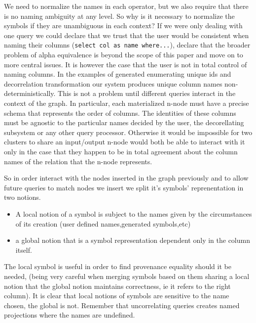 We need to normalize the names in each operator, but we also require
that there is no naming ambiguity at any level. So why is it necessary
to normalize the symbols if they are unambiguous in each context? If
we were only dealing with one query we could declare that we trust
that the user would be consistent when naming their columns (\texttt{select
  col as name where...}), declare that the broader problem of alpha
equivalence is beyond the scope of this paper and move on to more
central issues. It is however the case that the user is not in total
control of naming columns. In the examples of generated enumerating
unique ids and decorrelation transformation our system produces unique
column names non-deterministically. This is not a problem until
different queries interact in the context of the graph. In particular,
each materialized n-node must have a precise schema that represents
the order of columns. The identities of these columns must be agnostic
to the particular names decided by the user, the decorellating
subsystem or any other query processor. Otherwise it would be
impossible for two clusters to share an input/output n-node would both
be able to interact with it only in the case that they happen to be in
total agreement about the column names of the relation that the n-node
represents.

So in order interact with the nodes inserted in the graph
previously and to allow future queries to match nodes we insert we
split it's symbols' reprenentation in two notions.

\begin{itemize}
\item A local notion of a symbol is subject to the names given by the
  circumstances of its creation (user defined names,generated
  symbols,etc)
\item a global notion that is a symbol representation dependent only in
  the column itself.
\end{itemize}

The local symbol is useful in order to find provenance equality
should it be needed, (being very careful when merging symbols based
on them sharing a local notion that the global notion maintains
correctness, ie it refers to the right column). It is clear that
local notions of symbols are sensitive to the name chosen, the
global is not. Remember that uncorrelating queries creates named
projections where the names are undefined.

